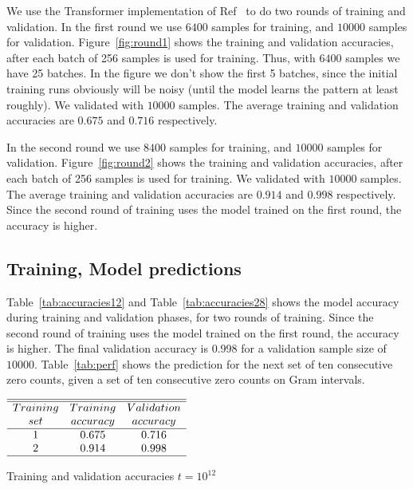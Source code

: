 \documentclass[twoside]{article}
\begin{document}
We use the Transformer implementation of Ref~\cite{shankergit} to do two rounds of training and validation. In the first round we use $6400$ samples for training, and $10000$ samples for validation. Figure~\ref{fig:round1} shows the training and validation accuracies, after each batch of 256 samples is used for training. Thus, with $6400$ samples we have 25 batches. In the figure we don't show the first 5 batches, since the initial training runs obviously will be noisy (until the model learns the pattern at least roughly). We validated with $10000$ samples. The average training and validation accuracies are $0.675$ and $0.716$ respectively.

In the second round we use $8400$ samples for training, and $10000$ samples for validation. Figure~\ref{fig:round2} shows the training and validation accuracies, after each batch of 256 samples is used for training.  We validated with $10000$ samples. The average training and validation accuracies are $0.914$ and $0.998$ respectively. Since the second round of training uses the model trained on the first round, the accuracy is higher.

\subsection{\label{relation}Training,  Model predictions}

Table~\ref{tab:accuracies12} and Table~\ref{tab:accuracies28} shows the model accuracy during training and validation phases, for two rounds of training. Since the second round of training uses the model trained on the first round, the accuracy is higher. The final validation accuracy is 0.998 for a validation sample size of $10000$.
Table~\ref{tab:perf} shows the prediction for the next set of ten consecutive zero counts, given a set of ten consecutive zero counts on Gram intervals.  

\begin{table}
\centering \(\begin{array}{ccc}
\hline
\hline
Training  & Training &Validation  \\
set     &accuracy&accuracy\\
\hline
1  & 0.675 & 0.716 \\

2  & 0.914 & 0.998 \\
\hline
\end{array}\)
\caption{Training and validation accuracies $t=10^{12}$}
\label{tab:accuracies12}
\end{table}
\end{document}
